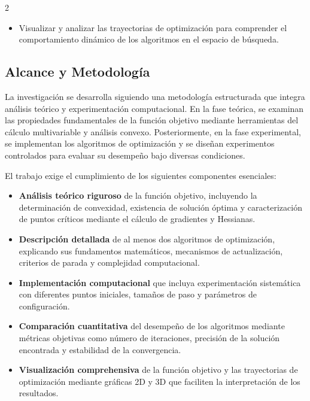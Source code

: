 \documentclass[11pt, a4paper, twocolumn]{beamer}
\begin{document}
\begin{multicols}{2}
\begin{itemize}
			\item Visualizar y analizar las trayectorias de optimización para comprender el comportamiento dinámico de los algoritmos en el espacio de búsqueda.
		\end{itemize}
		\subsection{Alcance y Metodología}
					
		La investigación se desarrolla siguiendo una metodología estructurada que integra análisis teórico y experimentación computacional. En la fase teórica, se examinan las propiedades fundamentales de la función objetivo mediante herramientas del cálculo multivariable y análisis convexo. Posteriormente, en la fase experimental, se implementan los algoritmos de optimización y se diseñan experimentos controlados para evaluar su desempeño bajo diversas condiciones.
		
		El trabajo exige el cumplimiento de los siguientes componentes esenciales:
		\begin{itemize}
			\item \textbf{Análisis teórico riguroso} de la función objetivo, incluyendo la determinación de convexidad, existencia de solución óptima y caracterización de puntos críticos mediante el cálculo de gradientes y Hessianas.
			
			\item \textbf{Descripción detallada} de al menos dos algoritmos de optimización, explicando sus fundamentos matemáticos, mecanismos de actualización, criterios de parada y complejidad computacional.
			
			\item \textbf{Implementación computacional} que incluya experimentación sistemática con diferentes puntos iniciales, tamaños de paso y parámetros de configuración.
			
			\item \textbf{Comparación cuantitativa} del desempeño de los algoritmos mediante métricas objetivas como número de iteraciones, precisión de la solución encontrada y estabilidad de la convergencia.
			
			\item \textbf{Visualización comprehensiva} de la función objetivo y las trayectorias de optimización mediante gráficas 2D y 3D que faciliten la interpretación de los resultados.
			
		\end{itemize}
		

\end{multicols}
\end{document}

